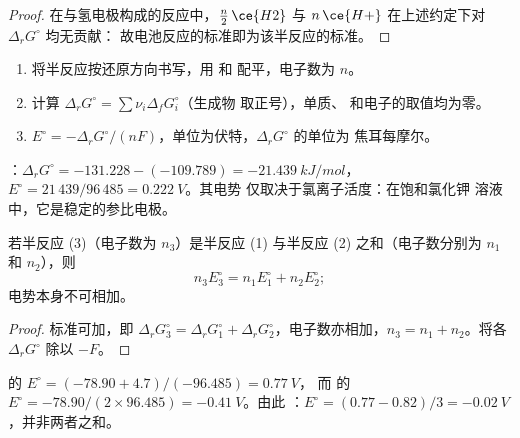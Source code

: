 \begin{proof}
在与氢电极构成的反应中，$\tfrac n2\,\ce{H2}$ 与
$n\,\ce{H+}$ 在上述约定下对 $\Delta_r G^\circ$ 均无贡献：
故电池反应的标准即为该半反应的标准。
\end{proof}

\begin{method}[由数据表求标准电极电势]\label{met:b2:cell-thermodynamics:e-from-gibbs}
\begin{enumerate}
  \item 将半反应按还原方向书写，用  和
         配平，电子数为 $n$。
  \item 计算 $\Delta_r G^\circ = \sum\nu_i\Delta_f G^\circ_i$（生成物
        取正号），单质、 和电子的取值均为零。
  \item $E^\circ = -\Delta_r G^\circ/(nF)$，单位为伏特，$\Delta_r G^\circ$ 的单位为
        焦耳每摩尔。
\end{enumerate}
\end{method}

\begin{example}[氯化银电极]\label{ex:b2:cell-thermodynamics:agcl}
：$\Delta_r G^\circ = -131.228 - (-109.789) =
\qty{-21.439}{kJ/mol}$，$E^\circ = 21\,439/96\,485 = \qty{0.222}{V}$。其电势
仅取决于氯离子活度：在饱和氯化钾
溶液中，它是稳定的参比电极。
\end{example}

\begin{proposition}[电极电势的组合]\label{prop:b2:cell-thermodynamics:combining}
若半反应 (3)（电子数为 $n_3$）是半反应 (1)
与半反应 (2) 之和（电子数分别为 $n_1$ 和 $n_2$），则
\[
  n_3E_3^\circ = n_1E_1^\circ + n_2E_2^\circ ;
\]
电势本身不可相加。
\end{proposition}

\begin{proof}
标准可加，即 $\Delta_r G_3^\circ = \Delta_r G_1^\circ + \Delta_r
G_2^\circ$，电子数亦相加，$n_3 = n_1 + n_2$。将各 $\Delta_r
G^\circ$ 除以 $-F$。
\end{proof}

\begin{example}[铁的两种氧化态]\label{ex:b2:cell-thermodynamics:iron}
 的 $E^\circ = (-78.90 + 4.7)/(-96.485) = \qty{0.77}{V}$，
而  的 $E^\circ = -78.90/(2 \times 96.485) =
\qty{-0.41}{V}$。由此 ：$E^\circ = (0.77 - 0.82)/3 =
\qty{-0.02}{V}$，并非两者之和。
\end{example}

